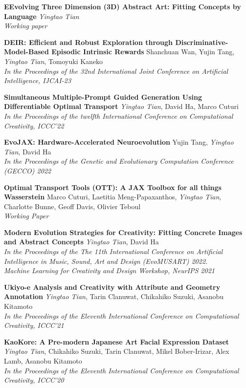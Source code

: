 \documentclass[line,margin]{cv}
\begin{document}
\begin{resume}
  {\bf EEvolving Three Dimension (3D) Abstract Art: Fitting Concepts by Language}
  \emph{Yingtao Tian}\\
  \emph{Working paper}

  {\bf DEIR: Efficient and Robust Exploration through Discriminative-Model-Based Episodic Intrinsic Rewards}
  Shanchuan Wan, Yujin Tang, \emph{Yingtao Tian}, Tomoyuki Kaneko\\
  \emph{In the Proceedings of the 32nd International Joint Conference on Artificial Intelligence, IJCAI-23}

  {\bf Simultaneous Multiple-Prompt Guided Generation Using Differentiable Optimal Transport}
  \emph{Yingtao Tian}, David Ha, Marco Cuturi\\
  \emph{In the Proceedings of the twelfth International Conference on Computational Creativity, ICCC'22}

  {\bf EvoJAX: Hardware-Accelerated Neuroevolution}
  Yujin Tang, \emph{Yingtao Tian}, David Ha\\
  \emph{In the Proceedings of the Genetic and Evolutionary Computation Conference (GECCO) 2022}

  {\bf Optimal Transport Tools (OTT): A JAX Toolbox for all things Wasserstein}
  Marco Cuturi, Laetitia Meng-Papaxanthos, \emph{Yingtao Tian}, Charlotte Bunne, Geoff Davis, Olivier Teboul\\
  \emph{Working Paper}

  {\bf Modern Evolution Strategies for Creativity: Fitting Concrete Images and Abstract Concepts}
  \emph{Yingtao Tian}, David Ha\\
  \emph{In the Proceedings of the The 11th International Conference on Artificial Intelligence in Music, Sound, Art and Design (EvoMUSART) 2022.\\
  Machine Learning for Creativity and Design Workshop, NeurIPS 2021}

  {\bf  Ukiyo-e Analysis and Creativity with Attribute and Geometry Annotation}
  \emph{Yingtao Tian}, Tarin Clanuwat, Chikahiko Suzuki, Asanobu Kitamoto\\
  \emph{In the Proceedings of the Eleventh International Conference on Computational Creativity, ICCC'21}

  {\bf  KaoKore: A Pre-modern Japanese Art Facial Expression Dataset}
  \emph{Yingtao Tian}, Chikahiko Suzuki, Tarin Clanuwat, Mikel Bober-Irizar, Alex Lamb, Asanobu Kitamoto\\
  \emph{In the Proceedings of the Eleventh International Conference on Computational Creativity, ICCC'20}


\end{resume}
\end{document}
